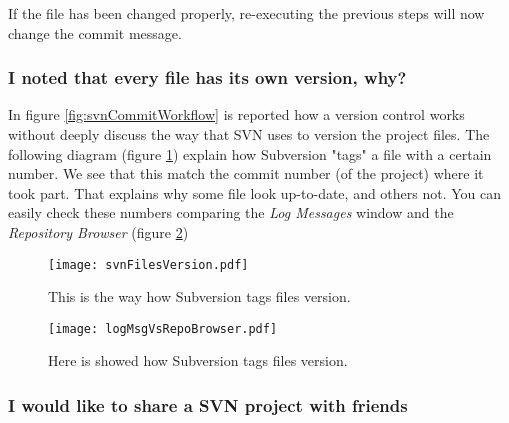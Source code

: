 

If the file has been changed properly, re-executing the previous steps will now change the commit message.







\subsubsection{I noted that every file has its own version, why?}
\label{subsubsectio:FileVersion}

In figure \ref{fig:svnCommitWorkflow} is reported how a version control works without deeply discuss the way that SVN uses to version the project files.
The following diagram (figure \ref{fig:svnFilesVersion}) explain how Subversion "tags" a file with a certain number. We see that this match the commit number (of the project) where it took part. That explains why some file look up-to-date, and others not. You can easily check these numbers comparing the \textit{Log Messages} window and the \textit{Repository Browser} (figure \ref{fig:logMsgVsRepoBrowser})



\begin{figure}[htbp]
    \centering
    \texttt{[image: svnFilesVersion.pdf]}
    \caption{This is the way how Subversion tags files version.}
    \label{fig:svnFilesVersion}
\end{figure}




\begin{figure}[htbp]
    \centering
    \texttt{[image: logMsgVsRepoBrowser.pdf]}
    \caption{Here is showed how Subversion tags files version.}
    \label{fig:logMsgVsRepoBrowser}
\end{figure}

\newpage

\subsubsection{I would like to share a SVN project with friends}
\label{subsubsectio:SvnAtHome}

